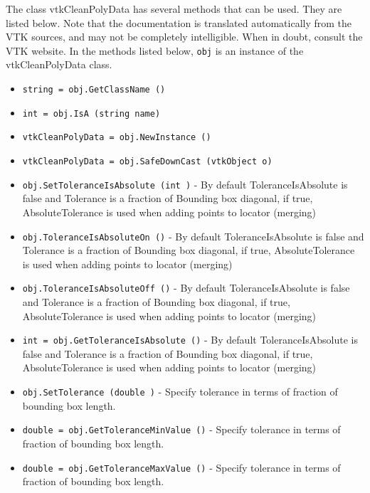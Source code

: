 The class vtkCleanPolyData has several methods that can be used.
  They are listed below.
Note that the documentation is translated automatically from the VTK sources,
and may not be completely intelligible.  When in doubt, consult the VTK website.
In the methods listed below, \verb|obj| is an instance of the vtkCleanPolyData class.
\begin{itemize}
\item  \verb|string = obj.GetClassName ()|

\item  \verb|int = obj.IsA (string name)|

\item  \verb|vtkCleanPolyData = obj.NewInstance ()|

\item  \verb|vtkCleanPolyData = obj.SafeDownCast (vtkObject o)|

\item  \verb|obj.SetToleranceIsAbsolute (int )| -  By default ToleranceIsAbsolute is false and Tolerance is
 a fraction of Bounding box diagonal, if true, AbsoluteTolerance is
 used when adding points to locator (merging)

\item  \verb|obj.ToleranceIsAbsoluteOn ()| -  By default ToleranceIsAbsolute is false and Tolerance is
 a fraction of Bounding box diagonal, if true, AbsoluteTolerance is
 used when adding points to locator (merging)

\item  \verb|obj.ToleranceIsAbsoluteOff ()| -  By default ToleranceIsAbsolute is false and Tolerance is
 a fraction of Bounding box diagonal, if true, AbsoluteTolerance is
 used when adding points to locator (merging)

\item  \verb|int = obj.GetToleranceIsAbsolute ()| -  By default ToleranceIsAbsolute is false and Tolerance is
 a fraction of Bounding box diagonal, if true, AbsoluteTolerance is
 used when adding points to locator (merging)

\item  \verb|obj.SetTolerance (double )| -  Specify tolerance in terms of fraction of bounding box length.

\item  \verb|double = obj.GetToleranceMinValue ()| -  Specify tolerance in terms of fraction of bounding box length.

\item  \verb|double = obj.GetToleranceMaxValue ()| -  Specify tolerance in terms of fraction of bounding box length.


\end{itemize}
